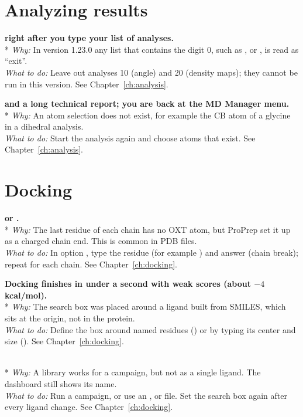 \section{Analyzing results}\label{sec:troubleshooting-analysis}

{\bfseries {} right after you type
your list of analyses.}\\*
\emph{Why:} In version 1.23.0 any list that contains the digit 0, such as
,  or , is read as ``exit''.\\
\emph{What to do:} Leave out analyses 10 (angle) and 20 (density maps); they
cannot be run in this version. See Chapter~\ref{ch:analysis}.

{\bfseries {} and a long technical report; you
are back at the MD Manager menu.}\\*
\emph{Why:} An atom selection does not exist, for example the CB atom of a
glycine in a dihedral analysis.\\
\emph{What to do:} Start the analysis again and choose atoms that exist. See
Chapter~\ref{ch:analysis}.

\section{Docking}\label{sec:troubleshooting-docking}

{\bfseries {} or
.}\\*
\emph{Why:} The last residue of each chain has no OXT atom, but ProPrep set
it up as a charged chain end. This is common in PDB files.\\
\emph{What to do:} In option , type the residue (for example
) and answer  (chain break); repeat for each chain. See
Chapter~\ref{ch:docking}.

{\bfseries Docking finishes in under a second with weak scores (about
$-4$\,kcal/mol).}\\*
\emph{Why:} The search box was placed around a ligand built from SMILES,
which sits at the origin, not in the protein.\\
\emph{What to do:} Define the box around named residues () or by
typing its center and size (). See Chapter~\ref{ch:docking}.

{\bfseries {}}\\*
\emph{Why:} A  library works for a campaign, but not as a single
ligand. The dashboard still shows its name.\\
\emph{What to do:} Run a campaign, or use an ,  or
 file. Set the search box again after every ligand change. See
Chapter~\ref{ch:docking}.

